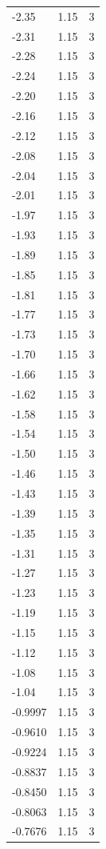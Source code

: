 \begin{longtable}{lrr}
  -2.35 & 1.15 & 3 \\
  -2.31 & 1.15 & 3 \\
  -2.28 & 1.15 & 3 \\
  -2.24 & 1.15 & 3 \\
  -2.20 & 1.15 & 3 \\
  -2.16 & 1.15 & 3 \\
  -2.12 & 1.15 & 3 \\
  -2.08 & 1.15 & 3 \\
  -2.04 & 1.15 & 3 \\
  -2.01 & 1.15 & 3 \\
  -1.97 & 1.15 & 3 \\
  -1.93 & 1.15 & 3 \\
  -1.89 & 1.15 & 3 \\
  -1.85 & 1.15 & 3 \\
  -1.81 & 1.15 & 3 \\
  -1.77 & 1.15 & 3 \\
  -1.73 & 1.15 & 3 \\
  -1.70 & 1.15 & 3 \\
  -1.66 & 1.15 & 3 \\
  -1.62 & 1.15 & 3 \\
  -1.58 & 1.15 & 3 \\
  -1.54 & 1.15 & 3 \\
  -1.50 & 1.15 & 3 \\
  -1.46 & 1.15 & 3 \\
  -1.43 & 1.15 & 3 \\
  -1.39 & 1.15 & 3 \\
  -1.35 & 1.15 & 3 \\
  -1.31 & 1.15 & 3 \\
  -1.27 & 1.15 & 3 \\
  -1.23 & 1.15 & 3 \\
  -1.19 & 1.15 & 3 \\
  -1.15 & 1.15 & 3 \\
  -1.12 & 1.15 & 3 \\
  -1.08 & 1.15 & 3 \\
  -1.04 & 1.15 & 3 \\
  -0.9997 & 1.15 & 3 \\
  -0.9610 & 1.15 & 3 \\
  -0.9224 & 1.15 & 3 \\
  -0.8837 & 1.15 & 3 \\
  -0.8450 & 1.15 & 3 \\
  -0.8063 & 1.15 & 3 \\
  -0.7676 & 1.15 & 3 \\

\end{longtable}
